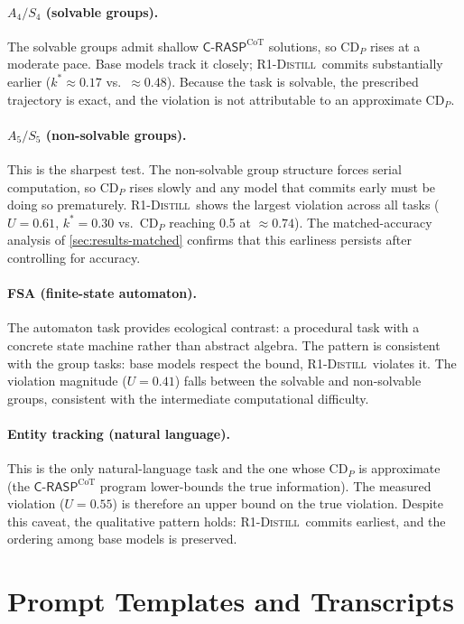 \documentclass[11pt]{article}
\newcommand{\CDP}{\mathrm{CD}_{P}}
\newcommand{\stepk}{k}
\newcommand{\Rdistill}{\textsc{R1-Distill}}
\begin{document}
\paragraph{$A_4/S_4$ (solvable groups).}
The solvable groups admit shallow $\mathsf{C\text{-}RASP}^{\mathrm{CoT}}$
solutions, so $\CDP$ rises at a moderate pace. Base models track it closely;
\Rdistill\ commits substantially earlier ($\stepk^{*}\approx 0.17$ vs.\
$\approx 0.48$). Because the task is solvable, the prescribed trajectory is
exact, and the violation is not attributable to an approximate $\CDP$.

\paragraph{$A_5/S_5$ (non-solvable groups).}
This is the sharpest test. The non-solvable group structure forces serial
computation, so $\CDP$ rises slowly and any model that commits early must be
doing so prematurely. \Rdistill\ shows the largest violation across all tasks
($U=0.61$, $\stepk^{*}=0.30$ vs.\ $\CDP$ reaching 0.5 at $\approx 0.74$).
The matched-accuracy analysis of \cref{sec:results-matched} confirms that this
earliness persists after controlling for accuracy.

\paragraph{FSA (finite-state automaton).}
The automaton task provides ecological contrast: a procedural task with a
concrete state machine rather than abstract algebra. The pattern is consistent
with the group tasks: base models respect the bound, \Rdistill\ violates it.
The violation magnitude ($U=0.41$) falls between the solvable and non-solvable
groups, consistent with the intermediate computational difficulty.

\paragraph{Entity tracking (natural language).}
This is the only natural-language task and the one whose $\CDP$ is approximate
(the $\mathsf{C\text{-}RASP}^{\mathrm{CoT}}$ program lower-bounds the true
information). The measured violation ($U=0.55$) is therefore an upper bound on
the true violation. Despite this caveat, the qualitative pattern holds:
\Rdistill\ commits earliest, and the ordering among base models is preserved.

\section{Prompt Templates and Transcripts}
\label{app:prompts}
\end{document}
